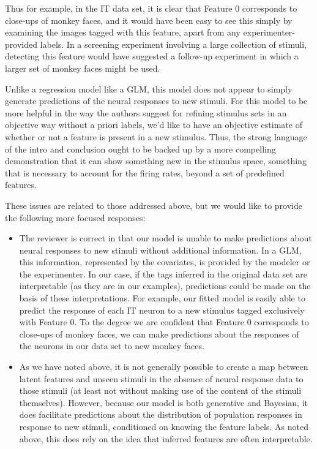 \documentclass[12pt,a4paper]{article}
\newcommand{\edit}[1]{\textcolor{edit}{#1}}
\begin{document}
\edit{
Thus for example, in the IT data set, it is clear that Feature 0 corresponds to close-ups of monkey faces, and it would have been easy to see this simply by examining the images tagged with this feature, apart from any experimenter-provided labels. In a screening experiment involving a large collection of stimuli, detecting this feature would have suggested a follow-up experiment in which a larger set of monkey faces might be used.
}

Unlike a regression model like a GLM, this model does not appear to simply generate predictions of the neural responses to new stimuli. For this model to be more helpful in the way the authors suggest for refining stimulus sets in an objective way without a priori labels, we’d like to have an objective estimate of whether or not a feature is present in a new stimulus. Thus, the strong language of the intro and conclusion ought to be backed up by a more compelling demonstration that it can show something new in the stimulus space, something that is necessary to account for the firing rates, beyond a set of predefined features.

\edit{
These issues are related to those addressed above, but we would like to provide the following more focused responses:
\begin{itemize}
    \item The reviewer is correct in that our model is unable to make predictions about neural responses to new stimuli without additional information. In a GLM, this information, represented by the covariates, is provided by the modeler or the experimenter. In our case, if the tags inferred in the original data set are interpretable (as they are in our examples), predictions could be made on the basis of these interpretations. For example, our fitted model is easily able to predict the response of each IT neuron to a new stimulus tagged exclusively with Feature 0. To the degree we are confident that Feature 0 corresponds to close-ups of monkey faces, we can make predictions about the responses of the neurons in our data set to new monkey faces.
    \item As we have noted above, it is not generally possible to create a map between latent features and unseen stimuli in the absence of neural response data to those stimuli (at least not without making use of the content of the stimuli themselves). However, because our model is both generative and Bayesian, it does facilitate predictions about the distribution of population responses in response to new stimuli, conditioned on knowing the feature labels. As noted above, this does rely on the idea that inferred features are often interpretable.
\end{itemize}
}
\end{document}
